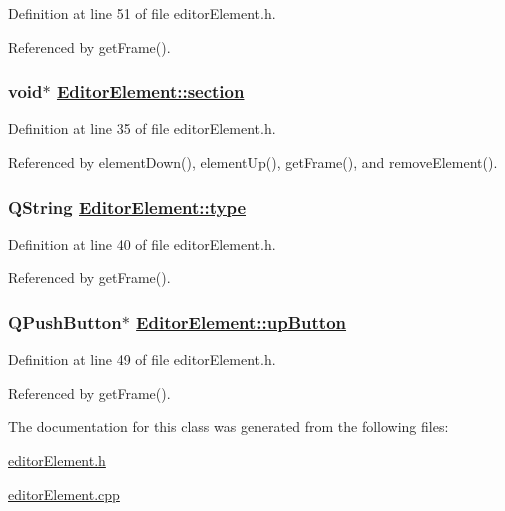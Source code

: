 Definition at line 51 of file editor\-Element.h.

Referenced by get\-Frame().\hypertarget{classEditorElement_r1}{
\subsubsection[section]{\setlength{\rightskip}{0pt plus 5cm}void$\ast$ \hyperlink{classEditorElement_r1}{Editor\-Element::section}}}
\label{classEditorElement_r1}


Definition at line 35 of file editor\-Element.h.

Referenced by element\-Down(), element\-Up(), get\-Frame(), and remove\-Element().\hypertarget{classEditorElement_r4}{
\subsubsection[type]{\setlength{\rightskip}{0pt plus 5cm}QString \hyperlink{classEditorElement_r4}{Editor\-Element::type}}}
\label{classEditorElement_r4}


Definition at line 40 of file editor\-Element.h.

Referenced by get\-Frame().\hypertarget{classEditorElement_r12}{
\subsubsection[upButton]{\setlength{\rightskip}{0pt plus 5cm}QPush\-Button$\ast$ \hyperlink{classEditorElement_r12}{Editor\-Element::up\-Button}}}
\label{classEditorElement_r12}


Definition at line 49 of file editor\-Element.h.

Referenced by get\-Frame().

The documentation for this class was generated from the following files:\begin{CompactItemize}
\item 
\hyperlink{editorElement_8h}{editor\-Element.h}\item 
\hyperlink{editorElement_8cpp}{editor\-Element.cpp}\end{CompactItemize}
